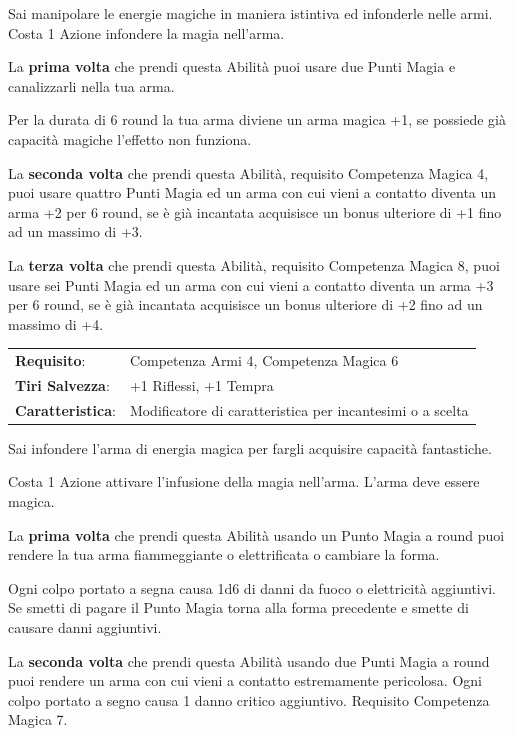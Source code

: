 \begin{multicols}{2}
Sai manipolare le energie magiche in maniera istintiva ed infonderle nelle armi. Costa 1 Azione infondere la magia nell'arma.

La \textbf{prima volta} che prendi questa Abilità puoi usare due Punti Magia e canalizzarli nella tua arma.

Per la durata di 6 round la tua arma diviene un arma magica +1, se possiede già capacità magiche l'effetto non funziona.

La \textbf{seconda volta} che prendi questa Abilità, requisito Competenza Magica 4, puoi usare quattro Punti Magia ed un arma con cui vieni a contatto diventa un arma +2 per 6 round, se è già incantata acquisisce un bonus ulteriore di +1 fino ad un massimo di +3.

La \textbf{terza volta} che prendi questa Abilità, requisito Competenza Magica 8, puoi usare sei Punti Magia ed un arma con cui vieni a contatto diventa un arma +3 per 6 round, se è già incantata acquisisce un bonus ulteriore di +2 fino ad un massimo di +4.

\hspace{-0.2cm}\begin{tabularx}{\linewidth}{l@{\hspace{8pt}}X}
\rowcolor{gray!20}\textbf{Requisito}: & Competenza Armi 4, Competenza Magica 6\\
\textbf{Tiri Salvezza}: & +1 Riflessi, +1 Tempra\\
\rowcolor{gray!20}\textbf{Caratteristica}: & Modificatore di caratteristica per incantesimi o a scelta\\
\end{tabularx}\smallskip

Sai infondere l'arma di energia magica per fargli acquisire capacità fantastiche.

Costa 1 Azione attivare l'infusione della magia nell'arma. L'arma deve essere magica.

La \textbf{prima volta} che prendi questa Abilità usando un Punto Magia a round puoi rendere la tua arma fiammeggiante o elettrificata o cambiare la forma.

Ogni colpo portato a segna causa 1d6 di danni da fuoco o elettricità aggiuntivi. Se smetti di pagare il Punto Magia torna alla forma precedente e smette di causare danni aggiuntivi.

La \textbf{seconda volta} che prendi questa Abilità usando due Punti Magia a round puoi rendere un arma con cui vieni a contatto estremamente pericolosa. Ogni colpo portato a segno causa 1 danno critico aggiuntivo. Requisito Competenza Magica 7.


\end{multicols}
